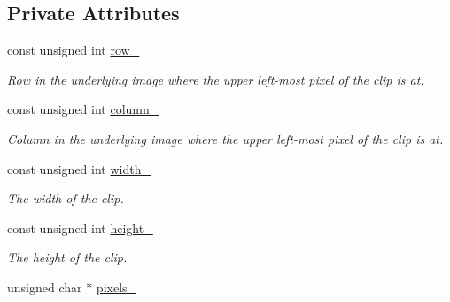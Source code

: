 \subsection*{Private Attributes}
\begin{CompactItemize}
\item 
\hypertarget{class_clip_0cd08f7e03723520abc92275edb576e2}{
const unsigned int \hyperlink{class_clip_0cd08f7e03723520abc92275edb576e2}{row\_\-}}
\label{class_clip_0cd08f7e03723520abc92275edb576e2}

\begin{CompactList}\small\item\em Row in the underlying image where the upper left-most pixel of the clip is at. \item\end{CompactList}\item 
\hypertarget{class_clip_d9977cd397e167b9185bdeb0fda68120}{
const unsigned int \hyperlink{class_clip_d9977cd397e167b9185bdeb0fda68120}{column\_\-}}
\label{class_clip_d9977cd397e167b9185bdeb0fda68120}

\begin{CompactList}\small\item\em Column in the underlying image where the upper left-most pixel of the clip is at. \item\end{CompactList}\item 
\hypertarget{class_clip_f8547b17e2ad42a17e39b25f7951faaa}{
const unsigned int \hyperlink{class_clip_f8547b17e2ad42a17e39b25f7951faaa}{width\_\-}}
\label{class_clip_f8547b17e2ad42a17e39b25f7951faaa}

\begin{CompactList}\small\item\em The width of the clip. \item\end{CompactList}\item 
\hypertarget{class_clip_35dd13977f3e15d04053260154ebf42e}{
const unsigned int \hyperlink{class_clip_35dd13977f3e15d04053260154ebf42e}{height\_\-}}
\label{class_clip_35dd13977f3e15d04053260154ebf42e}

\begin{CompactList}\small\item\em The height of the clip. \item\end{CompactList}\item 
\hypertarget{class_clip_e8dc6d41fb103eaafa9bc5963ab6d826}{
unsigned char $\ast$ \hyperlink{class_clip_e8dc6d41fb103eaafa9bc5963ab6d826}{pixels\_\-}}
\label{class_clip_e8dc6d41fb103eaafa9bc5963ab6d826}


\end{CompactItemize}
